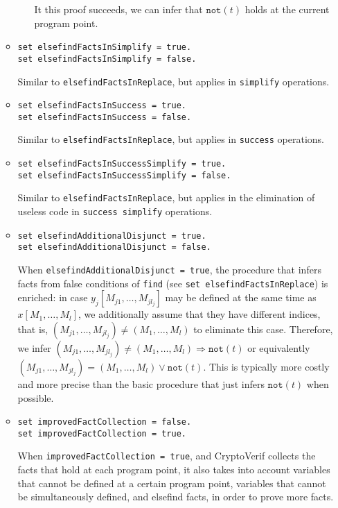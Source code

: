\begin{itemize}
\begin{itemize}
\begin{itemize}
It this proof succeeds, we can infer that $\texttt{not}(t)$ holds
at the current program point.
\end{itemize}

\item \texttt{set elsefindFactsInSimplify = true.}\\
\texttt{set elsefindFactsInSimplify = false.}

Similar to \texttt{elsefindFactsInReplace}, but applies in
\texttt{simplify} operations. 

\item \texttt{set elsefindFactsInSuccess = true.}\\
\texttt{set elsefindFactsInSuccess = false.}

Similar to \texttt{elsefindFactsInReplace}, but applies in
\texttt{success} operations. 

\item \texttt{set elsefindFactsInSuccessSimplify = true.}\\
\texttt{set elsefindFactsInSuccessSimplify = false.}

Similar to \texttt{elsefindFactsInReplace}, but applies in
the elimination of useless code in \texttt{success simplify} operations. 


\item \texttt{set elsefindAdditionalDisjunct = true.}\\
\texttt{set elsefindAdditionalDisjunct = false.}

When \texttt{elsefindAdditionalDisjunct = true}, the procedure that infers facts
from false conditions of \texttt{find} (see \texttt{set elsefindFactsInReplace})
is enriched: in case $y_j[M_{j1}, \ldots, M_{jl_j}]$ may be defined
at the same time as $x[M_1, \ldots, M_l]$, we additionally assume
that they have different indices, that is, $(M_{j1}, \ldots, M_{jl_j}) \neq (M_1, \ldots, M_l)$
to eliminate this case. Therefore, we infer 
$(M_{j1}, \ldots, M_{jl_j}) \neq (M_1, \ldots, M_l) \Rightarrow \texttt{not}(t)$
or equivalently $(M_{j1}, \ldots, M_{jl_j}) = (M_1, \ldots, M_l) \vee \texttt{not}(t)$.
This is typically more costly and more precise than the basic 
procedure that just infers $\texttt{not}(t)$ when possible.

\item \texttt{set improvedFactCollection = false.}\\
\texttt{set improvedFactCollection = true.}

When \texttt{improvedFactCollection = true}, and CryptoVerif collects
the facts that hold at each program point, it also takes into account
variables that cannot be defined at a certain program point, variables
that cannot be simultaneously defined, and elsefind facts, in order to
prove more facts.


\end{itemize}
\end{itemize}
